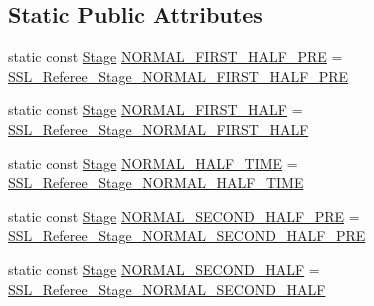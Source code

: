 \subsection*{Static Public Attributes}
\begin{DoxyCompactItemize}
\item 
static const \hyperlink{referee_8pb_8h_a38b80041d0259d508796c1bc7ab57c4c}{Stage} \hyperlink{class_s_s_l___referee_a13e7e4c85f27953e87470c13857543f6}{N\-O\-R\-M\-A\-L\-\_\-\-F\-I\-R\-S\-T\-\_\-\-H\-A\-L\-F\-\_\-\-P\-R\-E} = \hyperlink{referee_8pb_8h_a38b80041d0259d508796c1bc7ab57c4ca089182120b48008285f3a8b3aa31ba00}{S\-S\-L\-\_\-\-Referee\-\_\-\-Stage\-\_\-\-N\-O\-R\-M\-A\-L\-\_\-\-F\-I\-R\-S\-T\-\_\-\-H\-A\-L\-F\-\_\-\-P\-R\-E}
\item 
static const \hyperlink{referee_8pb_8h_a38b80041d0259d508796c1bc7ab57c4c}{Stage} \hyperlink{class_s_s_l___referee_a317b91f53a62d07813c07925b506a760}{N\-O\-R\-M\-A\-L\-\_\-\-F\-I\-R\-S\-T\-\_\-\-H\-A\-L\-F} = \hyperlink{referee_8pb_8h_a38b80041d0259d508796c1bc7ab57c4ca8913ac7892814d9e0602a7f8d99542f9}{S\-S\-L\-\_\-\-Referee\-\_\-\-Stage\-\_\-\-N\-O\-R\-M\-A\-L\-\_\-\-F\-I\-R\-S\-T\-\_\-\-H\-A\-L\-F}
\item 
static const \hyperlink{referee_8pb_8h_a38b80041d0259d508796c1bc7ab57c4c}{Stage} \hyperlink{class_s_s_l___referee_a52544628eb1bdc01890c04ce70726aca}{N\-O\-R\-M\-A\-L\-\_\-\-H\-A\-L\-F\-\_\-\-T\-I\-M\-E} = \hyperlink{referee_8pb_8h_a38b80041d0259d508796c1bc7ab57c4cabb33536b5d65563c123d1af79afabe34}{S\-S\-L\-\_\-\-Referee\-\_\-\-Stage\-\_\-\-N\-O\-R\-M\-A\-L\-\_\-\-H\-A\-L\-F\-\_\-\-T\-I\-M\-E}
\item 
static const \hyperlink{referee_8pb_8h_a38b80041d0259d508796c1bc7ab57c4c}{Stage} \hyperlink{class_s_s_l___referee_ae4a23a0f1936a8a1a8a4b0475f9b906d}{N\-O\-R\-M\-A\-L\-\_\-\-S\-E\-C\-O\-N\-D\-\_\-\-H\-A\-L\-F\-\_\-\-P\-R\-E} = \hyperlink{referee_8pb_8h_a38b80041d0259d508796c1bc7ab57c4cafe1ce4adabd25fc0c5eb18e4262df0cc}{S\-S\-L\-\_\-\-Referee\-\_\-\-Stage\-\_\-\-N\-O\-R\-M\-A\-L\-\_\-\-S\-E\-C\-O\-N\-D\-\_\-\-H\-A\-L\-F\-\_\-\-P\-R\-E}
\item 
static const \hyperlink{referee_8pb_8h_a38b80041d0259d508796c1bc7ab57c4c}{Stage} \hyperlink{class_s_s_l___referee_ad3723346f85ac4e7d0f0301a1e697bc6}{N\-O\-R\-M\-A\-L\-\_\-\-S\-E\-C\-O\-N\-D\-\_\-\-H\-A\-L\-F} = \hyperlink{referee_8pb_8h_a38b80041d0259d508796c1bc7ab57c4ca328e646a3fff24de888bd84c804e107c}{S\-S\-L\-\_\-\-Referee\-\_\-\-Stage\-\_\-\-N\-O\-R\-M\-A\-L\-\_\-\-S\-E\-C\-O\-N\-D\-\_\-\-H\-A\-L\-F}
\item 

\end{DoxyCompactItemize}
